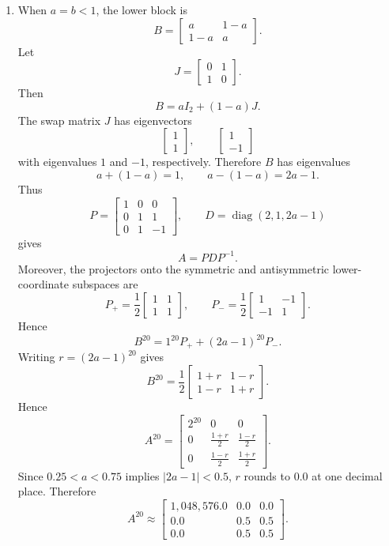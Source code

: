 \documentclass[12pt]{article}
\newcommand{\diag}{\operatorname{diag}}
\begin{document}
\begin{enumerate}[label=(\alph*)]
  \item When $a=b<1$, the lower block is
  \[
  B=\begin{bmatrix}a&1-a\\1-a&a\end{bmatrix}.
  \]
  Let
  \[
  J=\begin{bmatrix}0&1\\1&0\end{bmatrix}.
  \]
  Then
  \[
  B=aI_2+(1-a)J.
  \]
  The swap matrix $J$ has eigenvectors
  \[
  \begin{bmatrix}1\\1\end{bmatrix},\qquad \begin{bmatrix}1\\-1\end{bmatrix}
  \]
  with eigenvalues $1$ and $-1$, respectively. Therefore $B$ has eigenvalues
  \[
  a+(1-a)=1,
  \qquad
  a-(1-a)=2a-1.
  \]
  Thus
  \[
  P=\begin{bmatrix}1&0&0\\0&1&1\\0&1&-1\end{bmatrix},
  \qquad
  D=\diag(2,1,2a-1)
  \]
  gives
  \[
  A=PDP^{-1}.
  \]
  Moreover, the projectors onto the symmetric and antisymmetric lower-coordinate subspaces are
  \[
  P_+=\frac12\begin{bmatrix}1&1\\1&1\end{bmatrix},
  \qquad
  P_- =\frac12\begin{bmatrix}1&-1\\-1&1\end{bmatrix}.
  \]
  Hence
  \[
  B^{20}=1^{20}P_++(2a-1)^{20}P_-.
  \]
  Writing $r=(2a-1)^{20}$ gives
  \[
  B^{20}=\frac12\begin{bmatrix}1+r&1-r\\1-r&1+r\end{bmatrix}.
  \]
  Hence
  \[
  A^{20}=\begin{bmatrix}
  2^{20}&0&0\\
  0&\frac{1+r}{2}&\frac{1-r}{2}\\
  0&\frac{1-r}{2}&\frac{1+r}{2}
  \end{bmatrix}.
  \]
  Since $0.25<a<0.75$ implies $|2a-1|<0.5$, $r$ rounds to $0.0$ at one decimal place. Therefore
  \[
  \boxed{
  A^{20}\approx
  \begin{bmatrix}
  1{,}048{,}576.0&0.0&0.0\\
  0.0&0.5&0.5\\
  0.0&0.5&0.5
  \end{bmatrix}.}
  \]
\end{enumerate}
\end{document}
